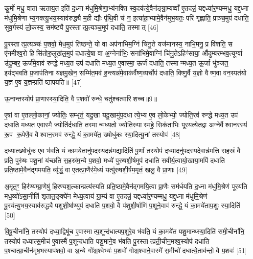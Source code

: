 कू॒र्मो मधु॒ वाता॑ ऋताय॒त इति॑ द॒ध्ना म॑धुमि॒श्रेणा॒भ्य॑नक्ति स्व॒दय॑त्ये॒वैन॑ङ्ग्रा॒म्यव्वाँ ए॒तदन्नं॒ यद्दध्या॑र॒ण्यम्मधु॒ यद्द॒ध्ना म॑धुमि॒श्रेणाभ्य॒नक्त्यु॒भय॒स्याव॑रुद्ध्यै म॒ही द्यौः पृ॑थि॒वी च॑ न॒ इत्या॑हा॒भ्यामे॒वैन॑मुभ॒यतः॒ परि॑ गृह्णाति॒ प्राञ्च॒मुप॑ दधाति॒ सुव॒र्गस्य॑ लो॒कस्य॒ सम॑ष्ट्यै पु॒रस्तात्प्र॒त्यञ्च॒मुप॑ दधाति॒ तस्मात् [46]

पु॒रस्तात्प्र॒त्यञ्चः॑ प॒शवो॒ मेध॒मुप॑ तिष्ठन्ते॒ यो वा अप॑नाभिम॒ग्निं चि॑नु॒ते यज॑मानस्य॒ नाभि॒मनु॒ प्र वि॑शति॒ स ए॑नमीश्व॒रो हिसि॑तोरु॒लूख॑ल॒मुप॑ दधात्ये॒षा वा अ॒ग्नेर्नाभिः॒ सना॑भिमे॒वाग्निं चि॑नु॒तेऽहिꣳ॑साया॒ औ॑दुम्बरम्भव॒त्यूर्ग्वा उ॑दु॒म्बर॒ ऊर्ज॑मे॒वाव॑ रुन्द्धे मध्य॒त उप॑ दधाति मध्य॒त ए॒वास्मा॒ ऊर्जं॑ दधाति॒ तस्मान्मध्य॒त ऊ॒र्जा भु॑ञ्जत॒ इय॑द्भवति प्र॒जाप॑तिना यज्ञमु॒खेन॒ सम्मि॑त॒मव॑ ह॒न्त्यन्न॑मे॒वाक॑र्वैष्ण॒व्यर्चोप॑ दधाति॒ विष्णु॒र्वै य॒ज्ञो वैष्ण॒वा वन॒स्पत॑यो य॒ज्ञ ए॒व य॒ज्ञम्प्रति॑ ष्ठापयति॥ [47]

{\scriptsize {ऊ॒नान्तस्योप॑ प्रा॒णास्स्या॒दिति॒ वै प॒शवो॑ रुन्धे॒ चतु॑श्चत्वारिशच्च॥9॥}}

ए॒षां वा ए॒तल्लो॒कानां॒ ज्योतिः॒ सम्भृ॑तं॒ यदु॒खा यदु॒खामु॑प॒दधात्ये॒भ्य ए॒व लो॒केभ्यो॒ ज्योति॒रव॑ रुन्द्धे मध्य॒त उप॑ दधाति मध्य॒त ए॒वास्मै॒ ज्योति॑र्दधाति॒ तस्मान्मध्य॒तो ज्योति॒रुपास्महे॒ सिक॑ताभिः पूरयत्ये॒तद्वा अ॒ग्नेर्वैश्वान॒रस्य॑ रू॒प रू॒पेणै॒व वैश्वान॒रमव॑ रुन्द्धे॒ यं का॒मये॑त॒ ख्षोधु॑कः स्या॒दित्यू॒नां तस्योप॑ [48]

द॒ध्या॒त्ख्षोधु॑क ए॒व भ॑वति॒ यं का॒मये॒तानु॑पदस्य॒दन्न॑मद्या॒दिति॑ पू॒र्णां तस्योप॑ दध्या॒दनु॑पदस्यदे॒वान्न॑मत्ति स॒हस्रं॒ वै प्रति॒ पुरु॑षः पशू॒नां य॑च्छति स॒हस्र॑म॒न्ये प॒शवो॒ मध्ये॑ पुरुषशी॒र्\mbox{}षमुप॑ दधाति सवीर्य॒त्वायो॒खाया॒मपि॑ दधाति प्रति॒ष्ठामे॒वैन॑द्गमयति॒ व्यृ॑द्धं॒ वा ए॒तत्प्रा॒णैर॑मे॒ध्यं यत्पु॑रुषशी॒र्\mbox{}षम॒मृतं॒ खलु॒ वै प्रा॒णाः [49]

अ॒मृत॒ꣳ॒ हिर॑ण्यम्प्रा॒णेषु॑ हिरण्यश॒ल्कान्प्रत्य॑स्यति प्रति॒ष्ठामे॒वैन॑द्गमयि॒त्वा प्रा॒णैः सम॑र्धयति द॒ध्ना म॑धुमि॒श्रेण॑ पूरयति मध॒व्यो॑ऽसा॒नीति॑ शृतात॒ङ्क्ये॑न मेध्य॒त्वाय॑ ग्रा॒म्यं वा ए॒तदन्नं॒ यद्दध्या॑र॒ण्यम्मधु॒ यद्द॒ध्ना म॑धुमि॒श्रेण॑ पू॒रय॑त्यु॒भय॒स्याव॑रुद्ध्यै पशुशी॒र्\mbox{}षाण्युप॑ दधाति प॒शवो॒ वै प॑शुशी॒र्\mbox{}षाणि॑ प॒शूने॒वाव॑ रुन्द्धे॒ यं का॒मये॑ताप॒शुः स्या॒दिति॑ [50]

वि॒षू॒चीना॑नि॒ तस्योप॑ दध्या॒द्विषू॑च ए॒वास्मात्प॒शून्द॑धात्यप॒शुरे॒व भ॑वति॒ यं का॒मये॑त पशु॒मान्थ्स्या॒दिति॑ समी॒चीना॑नि॒ तस्योप॑ दध्यात्स॒मीच॑ ए॒वास्मै॑ प॒शून्द॑धाति पशु॒माने॒व भ॑वति पु॒रस्तात्प्रती॒चीन॒मश्व॒स्योप॑ दधाति प॒श्चात्प्रा॒चीन॑मृष॒भस्याप॑शवो॒ वा अ॒न्ये गो॑अ॒श्वेभ्यः॑ प॒शवो॑ गोअ॒श्वाने॒वास्मै॑ स॒मीचो॑ दधात्ये॒ताव॑न्तो॒ वै प॒शवः॑ [51]

